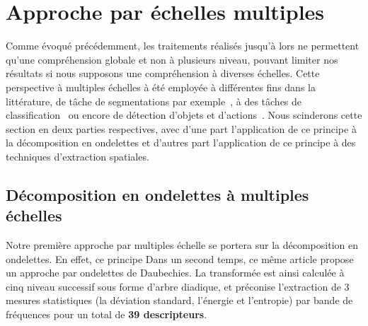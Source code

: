 \section{Approche par échelles multiples}
Comme évoqué précédemment, les traitements réalisés jusqu'à lors ne permettent qu'une compréhension globale et non à plusieurs niveau, pouvant limiter nos résultats si nous supposons une compréhension à diverses échelles. Cette perspective à multiples échelles à été employée à différentes fins dans la littérature, de tâche de segmentations par exemple~\cite{Santos2012}, à des tâches de classification~\cite{Alsaih2016} ou encore de détection d'objets et d'actions~\cite{Pedersoli2011}. Nous scinderons cette section en deux parties respectives, avec d'une part l'application de ce principe à la décomposition en ondelettes et d'autres part l'application de ce principe à des techniques d'extraction spatiales.\par 

\subsection{Décomposition en ondelettes à multiples échelles}
Notre première approche par multiples échelle se portera sur la décomposition en ondelettes. En effet, ce principe \cite{Carvalho2004}
Dans un second temps, ce même article propose un approche par ondelettes de Daubechies. La transformée est ainsi calculée à cinq niveau successif sous forme d'arbre diadique, et préconise l'extraction de 3 mesures statistiques (la déviation standard, l'énergie et l'entropie) par bande de fréquences pour un total de \textbf{39 descripteurs}.\par
 

